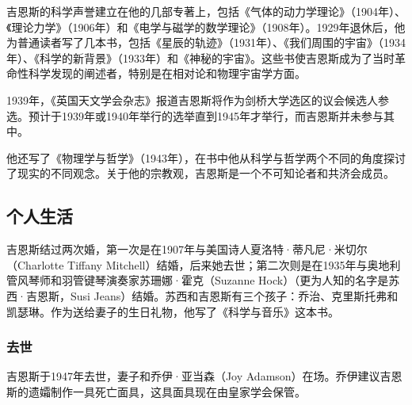 吉恩斯的科学声誉建立在他的几部专著上，包括《气体的动力学理论》（1904年）、《理论力学》（1906年）和《电学与磁学的数学理论》（1908年）。1929年退休后，他为普通读者写了几本书，包括《星辰的轨迹》（1931年）、《我们周围的宇宙》（1934年）、《科学的新背景》（1933年）和《神秘的宇宙》。这些书使吉恩斯成为了当时革命性科学发现的阐述者，特别是在相对论和物理宇宙学方面。

1939年，《英国天文学会杂志》报道吉恩斯将作为剑桥大学选区的议会候选人参选。预计于1939年或1940年举行的选举直到1945年才举行，而吉恩斯并未参与其中。

他还写了《物理学与哲学》（1943年），在书中他从科学与哲学两个不同的角度探讨了现实的不同观念。关于他的宗教观，吉恩斯是一个不可知论者和共济会成员。
\subsection{个人生活}  
吉恩斯结过两次婚，第一次是在1907年与美国诗人夏洛特·蒂凡尼·米切尔（Charlotte Tiffany Mitchell）结婚，后来她去世；第二次则是在1935年与奥地利管风琴师和羽管键琴演奏家苏珊娜·霍克（Suzanne Hock）（更为人知的名字是苏西·吉恩斯，Susi Jeans）结婚。苏西和吉恩斯有三个孩子：乔治、克里斯托弗和凯瑟琳。作为送给妻子的生日礼物，他写了《科学与音乐》这本书。
\subsubsection{去世}  
吉恩斯于1947年去世，妻子和乔伊·亚当森（Joy Adamson）在场。乔伊建议吉恩斯的遗孀制作一具死亡面具，这具面具现在由皇家学会保管。